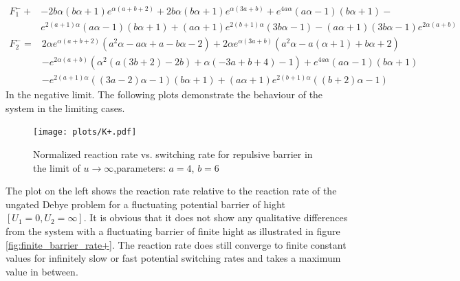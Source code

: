 \begin{align*}
    F_{1}^{-} + &-2 b \alpha (b \alpha+1) e^{\alpha (a+b+2)}+2 b \alpha (b \alpha+1) e^{\alpha (3 a+b)}+e^{4 a \alpha} (a \alpha-1) (b \alpha+1)- \\
                &e^{2 (a+1) \alpha} (a \alpha-1) (b \alpha+1)+(a \alpha+1) e^{2 (b+1) \alpha} (3 b \alpha-1)-(a \alpha+1) (3 b \alpha-1) e^{2 \alpha (a+b)}
\end{align*}
\begin{align*}
    F_{2}^{-} = & 2 \alpha e^{\alpha (a+b+2)} \left(a^2 \alpha-a \alpha+a-b \alpha-2\right)+2 \alpha e^{\alpha (3 a+b)} \left(a^2 \alpha-a (\alpha+1)+b \alpha+2\right) \\
                &-e^{2 \alpha (a+b)} \left(\alpha^2 (a (3 b+2)-2 b)+\alpha (-3 a+b+4)-1\right)+e^{4 a \alpha} (a \alpha-1) (b \alpha+1) \\
                &-e^{2 (a+1) \alpha} ((3 a-2) \alpha-1) (b \alpha+1)+(a \alpha+1) e^{2 (b+1) \alpha} ((b+2) \alpha-1)
\end{align*}
In the negative limit. The following plots demonstrate the behaviour of the system in the limiting cases.
\newpage
\begin{minipage}[t]{0.7 \textwidth}
    \begin{figure}[H]
        \texttt{[image: plots/K+.pdf]}
    \caption{Normalized reaction rate vs. switching rate for \newline repulsive barrier in the limit of $u \rightarrow \infty$,\newline parameters: $a = 4$, $b = 6$}
    \end{figure}
\end{minipage}\begin{minipage}[t]{0.3 \textwidth}
    The plot on the left shows the reaction rate relative to the reaction rate of the ungated Debye problem for a fluctuating potential barrier of hight $[U_1 = 0, U_2 = \infty]$. It is obvious that it does not show any qualitative differences from the system with a fluctuating barrier of finite hight as illustrated in figure \ref{fig:finite_barrier_rate+}. The reaction rate does still converge to finite constant values for infinitely slow or fast potential switching rates and takes a maximum value in between.
\end{minipage}

